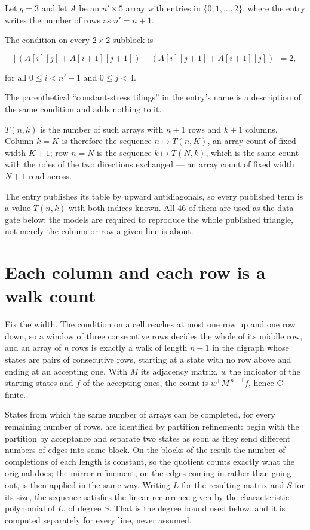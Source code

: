 \documentclass[11pt]{article}
\theoremstyle{definition}
\begin{document}
Let $q = 3$ and let $A$ be an $n' \times 5$ array with entries in $\{0,1,\dots,2\}$, where the entry writes the number of rows as $n' = n + 1$.

The condition on every $2 \times 2$ subblock is

\[\bigl|\,(A[i][j] + A[i{+}1][j{+}1]) - (A[i][j{+}1] + A[i{+}1][j])\,\bigr| = 2,\]

for all $0 \le i < n'-1$ and $0 \le j < 4$.

The parenthetical ``constant-stress tilings'' in the entry's name is a description of the same condition and adds nothing to it.

$T(n,k)$ is the number of such arrays with $n + 1$ rows and $k + 1$ columns. Column $k = K$ is therefore the sequence $n \mapsto T(n,K)$, an array count of fixed width $K + 1$; row $n = N$ is the sequence $k \mapsto T(N,k)$, which is the same count with the roles of the two directions exchanged --- an array count of fixed width $N + 1$ read across.

The entry publishes its table by upward antidiagonals, so every published term is a value $T(n,k)$ with both indices known. All 46 of them are used as the data gate below: the models are required to reproduce the whole published triangle, not merely the column or row a given line is about.

\section{Each column and each row is a walk count}

Fix the width. The condition on a cell reaches at most one row up and one row down, so a window of three consecutive rows decides the whole of its middle row, and an array of $n$ rows is exactly a walk of length $n-1$ in the digraph whose states are pairs of consecutive rows, starting at a state with no row above and ending at an accepting one. With $M$ its adjacency matrix, $w$ the indicator of the starting states and $f$ of the accepting ones, the count is $w^{\mathsf T}M^{\,n-1}f$, hence C-finite.

States from which the same number of arrays can be completed, for every remaining number of rows, are identified by partition refinement: begin with the partition by acceptance and separate two states as soon as they send different numbers of edges into some block. On the blocks of the result the number of completions of each length is constant, so the quotient counts exactly what the original does; the mirror refinement, on the edges coming in rather than going out, is then applied in the same way. Writing $L$ for the resulting matrix and $S$ for its size, the sequence satisfies the linear recurrence given by the characteristic polynomial of $L$, of degree $S$. That is the degree bound used below, and it is computed separately for every line, never assumed.
\end{document}
